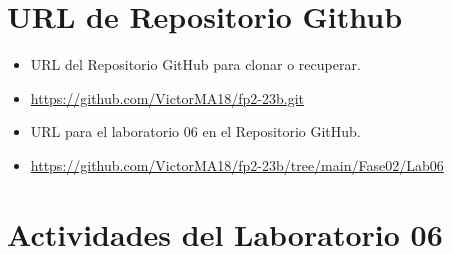 \documentclass{article}
\begin{document}
	\section{URL de Repositorio Github}
	\begin{itemize}
		\item URL del Repositorio GitHub para clonar o recuperar.
		\item \url{https://github.com/VictorMA18/fp2-23b.git}
		\item URL para el laboratorio 06 en el Repositorio GitHub.
		\item \url{https://github.com/VictorMA18/fp2-23b/tree/main/Fase02/Lab06}
	\end{itemize}
	
	\section{Actividades del Laboratorio 06}
	
\end{document}
